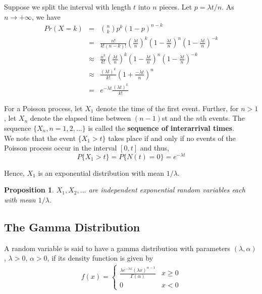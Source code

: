 \documentclass[12pt]{article}
\newtheorem{proposition}[theorem]{Proposition}
\begin{document}
Suppose we split the interval with length $t$ into $n$ pieces. Let $p = \lambda t/n$. As $n \rightarrow +\infty$, we have
\begin{eqnarray*}
  Pr(X = k)
  &=& \binom {n}{k} p^k (1-p)^{n-k} \\
  &=& \frac{n!}{k! (n-k)!} \left( \frac{\lambda t}{n} \right)^k
  \left( 1 - \frac{\lambda t}{n} \right)^n
  \left( 1 - \frac{\lambda t}{n} \right)^{-k} \\
  &\approx& \frac {n^k}{k!} \left( \frac{\lambda t}{n} \right)^k
  \left( 1 - \frac{\lambda t}{n} \right)^n
  \left( 1 - \frac{\lambda t}{n} \right)^{-k} \\
  &\approx& \frac{(\lambda  t)^k}{k!} \left( 1 + \frac{- \lambda t}{n}
  \right)^n \\
  &=& e^{-\lambda t} \frac{(\lambda t)^k}{k!} 
\end{eqnarray*}

For a Poisson process, let $X_1$ denote the time of the first event. Further, for $n>1$, let $X_n$ denote the elapsed time between $(n-1)$st and the $n$th events. The sequence $\{ X_n, n = 1,2,\dots \}$ is called the \textbf{sequence of interarrival times}. \\

We note that the event $\{ X_1 > t\}$ takes place if and only if no events of the Poisson process occur in the interval $[0,t]$ and thus,
\begin{equation*}
  P\{ X_1 > t \} = P\{ N(t)=0 \} = e^{-\lambda t}
\end{equation*}

Hence, $X_1$ is an exponential distribution with mean $1 / \lambda$.

\begin{proposition}
  $X_1, X_2, \dots$ are independent exponential random variables each with mean $1 / \lambda$.
\end{proposition}

\subsection{The Gamma Distribution}

A random variable is said to have a gamma distribution with parameters $(\lambda, \alpha)$, $\lambda > 0$, $\alpha > 0$, if its density function is given by
\begin{eqnarray*}
  f(x) =
  \begin{cases}
    \frac{\lambda e^{-\lambda x} (\lambda x)^{\alpha - 1}}{\Gamma(\alpha)}
    & x \ge 0 \\
    0 & x < 0
  \end{cases}
\end{eqnarray*}
\end{document}
